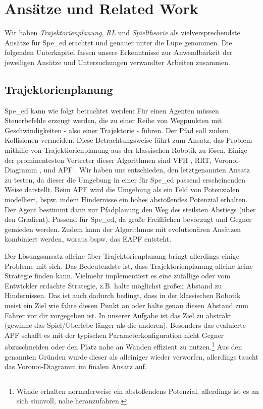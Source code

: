 \chapter{Ansätze und Related Work}
\label{cha:Ansaetze}
Wir haben \textit{Trajektorienplanung}, \textit{\acrlong{RL}} und \textit{Spieltheorie} als vielversprechendste Ansätze für Spe\_ed erachtet und genauer unter die Lupe genommen. Die folgenden Unterkapitel fassen unsere Erkenntnisse zur Anwendbarkeit der jeweiligen Ansätze und Untersuchungen verwandter Arbeiten zusammen.

\section{Trajektorienplanung}

Spe\_ed kann wie folgt betrachtet werden: F\"ur einen Agenten m\"ussen Steuerbefehle erzeugt werden, die zu einer Reihe von Wegpunkten mit Geschwindigkeiten - also einer Trajektorie - f\"uhren. Der Pfad soll zudem Kollisionen vermeiden. Diese Betrachtungsweise f\"uhrt zum Ansatz, das Problem mithilfe von Trajektiorienplanung aus der klassischen Robotik zu l\"osen. Einige der prominentesten Vertreter dieser Algorithmen sind \acrfull{VFH} \cite{Borenstein.}, \acrfull{RRT}\cite{S.Karaman.2011}, Voronoi-Diagramm \cite{Garrido.2006}, und \acrfull{APF} \cite{Raja.2012}. Wir haben uns entschieden, den letztgenannten Ansatz zu testen, da dieser die Umgebung in einer f\"ur Spe\_ed passend erscheinenden Weise darstellt. Beim \acrshort{APF} wird die Umgebung als ein Feld von Potenzialen modelliert, bspw. indem Hindernisse ein hohes abstoßendes Potenzial erhalten. Der Agent bestimmt dann zur Pfadplanung den Weg des steilsten Abstiegs (\"uber den Gradient). Passend f\"ur Spe\_ed, da große Freifl\"achen bevorzugt und Gegner gemieden werden. Zudem kann der Algorithmus mit evolution\"aren Ans\"atzen kombiniert werden, woraus bspw. das \acrfull{EAPF} entsteht. \cite{Raja.2012} 

Der L\"osungsansatz alleine \"uber Trajektorienplanung bringt allerdings einige Probleme mit sich. Das Bedeutendste ist, dass Trajektorienplanung alleine keine Strategie finden kann. Vielmehr implementiert es eine zuf\"allige oder vom Entwickler erdachte Strategie, z.B. \glqq halte m\"oglichst großen Abstand zu Hindernissen\grqq. Das ist auch dadurch bedingt, dass in der klassischen Robotik meist ein Ziel wie \glqq fahre diesen Punkt an\grqq{} oder \glqq halte genau diesen Abstand zum Fahrer vor dir\grqq{} vorgegeben ist. In unserer Aufgabe ist das Ziel zu abstrakt (\glqq gewinne das Spiel\grqq{}/\glqq Überlebe länger als die anderen\grqq{}). Besonders das evaluierte \acrshort{APF} schafft es mit der typischen Parameterkonfiguration nicht Gegner abzuschneiden oder den Platz nahe an W\"anden effizient zu nutzen.\footnote{W\"ande erhalten normalerweise ein abstoßendens Potenzial, allerdings ist es an sich sinnvoll, nahe heranzufahren.} Aus den genannten Gr\"unden wurde dieser als alleiniger wieder verworfen, allerdings taucht das Voronoi-Diagramm im finalen Ansatz auf.

